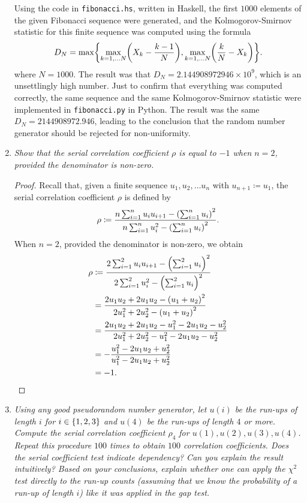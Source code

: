 \documentclass{article}
\newcommand{\defn}{\coloneqq}
\DeclarePairedDelimiter \set{\lbrace}{\rbrace}
\DeclarePairedDelimiter \parens{(}{)}
\begin{document}
\begin{enumerate}
        Using the code in \texttt{fibonacci.hs}, written in Haskell, the first $1000$ elements of the given Fibonacci sequence were generated,
        and the Kolmogorov-Smirnov statistic for this finite sequence was computed using the formula
        \begin{equation*}
            D_N = \max\set*{\max_{k = 1, \dots N}\parens*{X_k - \frac{k-1}{N}}, \max_{k = 1, \dots N}\parens*{\frac{k}{N} - X_k}}.
        \end{equation*}
        where $N = 1000$. The result was that $D_N = 2.144908972946 \times 10^9$, which is an unsettlingly high number.
        Just to confirm that everything was computed correctly, the same sequence and the same Kolmogorov-Smirnov statistic were implemented in \texttt{fibonacci.py} in Python.
        The result was the same $D_N = 2144908972.946$, leading to the conclusion that the random number generator should be rejected for non-uniformity.
    \item
        {\it Show that the serial correlation coefficient $\rho$ is equal to $-1$ when $n = 2$, provided the denominator is non-zero.}
        \begin{proof}
            Recall that, given a finite sequence $u_1, u_2, \dots u_n$ with $u_{n+1} \defn u_1$, the serial correlation coefficient $\rho$ is defined by
            \begin{equation*}
                \rho \defn \frac{n \sum_{i = 1}^{n}u_iu_{i+1} - \parens*{\sum_{i = 1}^{n}u_i}^2}{n \sum_{i = 1}^{n}u_i^2 - \parens*{\sum_{i = 1}^{n}u_i}^2}.
            \end{equation*}
            When $n = 2$, provided the denominator is non-zero, we obtain
            \begin{align*}
                \rho &\defn \frac{2 \sum_{i = 1}^{2}u_iu_{i+1} - \parens*{\sum_{i = 1}^{2}u_i}^2}{2 \sum_{i = 1}^{2}u_i^2 - \parens*{\sum_{i = 1}^{2}u_i}^2}\\
                &= \frac{2u_1u_2 + 2u_1u_2 - \parens*{u_1 + u_2}^2}{2u_1^2 + 2u_2^2 - \parens*{u_1 + u_2}^2}\\
                &= \frac{2u_1u_2 + 2u_1u_2 - u_1^2 - 2u_1u_2 - u_2^2}{2u_1^2 + 2u_2^2 - u_1^2 - 2u_1u_2 - u_2^2}\\
                &= -\frac{u_1^2 - 2u_1u_2 + u_2^2}{u_1^2 - 2u_1u_2 + u_2^2}\\
                &= -1.
            \end{align*}
        \end{proof}
    \item
        {\it Using any good pseudorandom number generator, let $u(i)$ be the run-ups of length $i$ for $i \in \set*{1, 2, 3}$ and $u(4)$ be the run-ups of length $4$ or more.
        Compute the serial correlation coefficient $\rho_4$ for $u(1), u(2), u(3), u(4)$.
        Repeat this procedure $100$ times to obtain $100$ correlation coefficients.
        Does the serial coefficient test indicate dependency?
        Can you explain the result intuitively?
        Based on your conclusions, explain whether one can apply the $\chi^2$ test directly to the run-up counts
        (assuming that we know the probability of a run-up of length $i$) like it was applied in the gap test.}


\end{enumerate}
\end{document}
